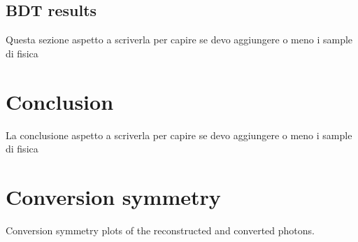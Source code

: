 \documentclass[a4paper, oneside]{book}
\begin{document}
		\section{BDT results}
			Questa sezione aspetto a scriverla per capire se devo aggiungere o meno i sample di fisica
		
	\chapter*{Conclusion}
		La conclusione aspetto a scriverla per capire se devo aggiungere o meno i sample di fisica
	\appendix
	\chapter{Conversion symmetry} \label{Appex: sym}
		Conversion symmetry plots of the reconstructed and converted photons. %
\end{document}
